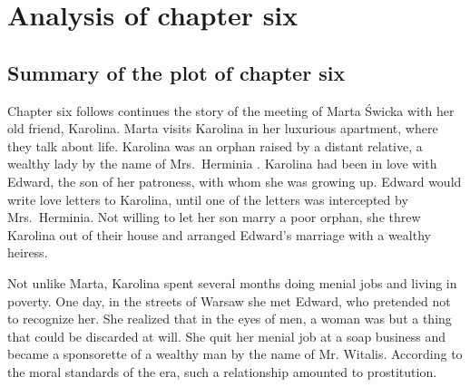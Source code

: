\section{Analysis of chapter six}

\subsection{Summary of the plot of chapter six}

Chapter six follows continues the story of the meeting of Marta Świcka with her old friend, Karolina.
Marta visits Karolina in her luxurious apartment, where they talk about life.
Karolina was an orphan raised by a distant relative, a wealthy lady by the name of Mrs.\ Herminia%
.
Karolina had been in love with Edward, the son of her patroness, with whom she was growing up.
Edward would write love letters to Karolina, until one of the letters was intercepted by Mrs.\ Herminia.
Not willing to let her son marry a poor orphan, she threw Karolina out of their house and arranged Edward's marriage with a wealthy heiress.

Not unlike Marta, Karolina spent several months doing menial jobs and living in poverty.
One day, in the streets of Warsaw she met Edward, who pretended not to recognize her.
She realized that in the eyes of men, a woman was but a thing that could be discarded at will.
She quit her menial job at a soap business and became a sponsorette of a wealthy man by the name of Mr. Witalis.
According to the moral standards of the era, such a relationship amounted to prostitution.
